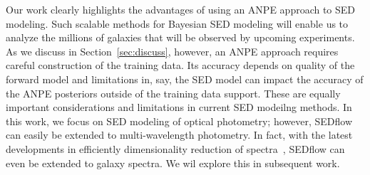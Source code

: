 Our work clearly highlights the advantages of using an ANPE approach to SED
modeling.  
Such scalable methods for Bayesian SED modeling will enable us to analyze the
millions of galaxies that will be observed by upcoming experiments. 
As we discuss in Section~\ref{sec:discuss}, however, an ANPE approach requires 
careful construction of the training data. 
Its accuracy depends on quality of the forward model and limitations in, say, 
the SED model can impact the accuracy of the ANPE posteriors outside of the
training data support. 
These are equally important considerations and limitations in current SED
modeilng methods. 
In this work, we focus on SED modeling of optical photometry; however,
{\sc SEDflow} can easily be extended to multi-wavelength photometry.
In fact, with the latest developments in efficiently dimensionality reduction
of spectra~\citep[, Melchior \& Hahn 2022]{portillo2020}, {\sc SEDflow} can
even be extended to galaxy spectra. 
We wil explore this in subsequent work. 

